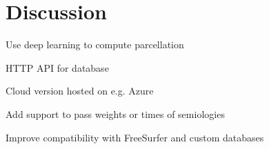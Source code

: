 \section{Discussion}

Use deep learning to compute parcellation

HTTP API for database

Cloud version hosted on e.g. Azure

Add support to pass weights or times of semiologies

Improve compatibility with FreeSurfer and custom databases
